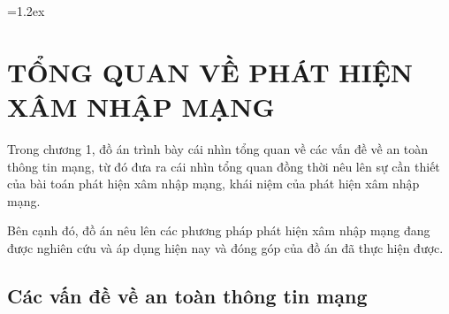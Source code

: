 \pagestyle{plain}
\graphicspath{{Chapter1/Figs/Raster/}{Chapter1/Figs/}}
\font=1.2ex
\chapter{TỔNG QUAN VỀ PHÁT HIỆN XÂM NHẬP MẠNG}
Trong chương 1, đồ án trình bày cái nhìn tổng quan về các vấn đề về an toàn thông tin mạng, từ đó đưa ra cái nhìn tổng quan đồng thời nêu lên sự cần thiết của bài toán phát hiện xâm nhập mạng, khái niệm của phát hiện xâm nhập mạng. 

Bên cạnh đó, đồ án nêu lên các phương pháp phát hiện xâm nhập mạng đang được nghiên cứu và áp dụng hiện nay và đóng góp của đồ án đã thực hiện được.

\section{Các vấn đề về an toàn thông tin mạng}


